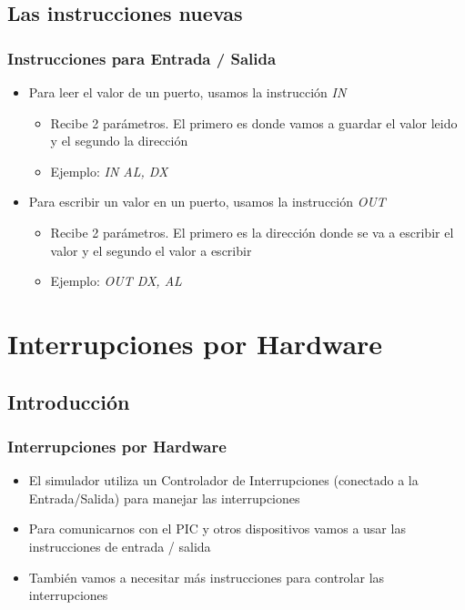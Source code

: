 \documentclass{beamer}
\begin{document}
\subsection{Las instrucciones nuevas}
\begin{frame}
\frametitle{Instrucciones para Entrada / Salida}

\begin{itemize}

 \item Para leer el valor de un puerto, usamos la instrucción \emph{IN} 
\begin{itemize}
\item Recibe 2 parámetros. El primero es donde vamos a guardar el valor leido y el segundo la dirección
 \item Ejemplo: \emph{IN AL, DX}
\end{itemize}

 \item Para escribir un valor en un puerto, usamos la instrucción \emph{OUT}
\begin{itemize}
\item Recibe 2 parámetros. El primero es la dirección donde se va a escribir el valor y el segundo el valor a escribir
\item  Ejemplo: \emph{OUT DX, AL}
\end{itemize}
\end{itemize}
\end{frame}

\section{Interrupciones por Hardware}
\subsection{Introducción}
\begin{frame}
\frametitle{Interrupciones por Hardware}
\begin{itemize}
 \item El simulador utiliza un Controlador de Interrupciones (conectado a la Entrada/Salida) para manejar las interrupciones
 \item Para comunicarnos con el PIC y otros dispositivos vamos a usar las instrucciones de entrada / salida
 \item También vamos a necesitar más instrucciones para controlar las interrupciones
\end{itemize}
\end{frame}
\end{document}
